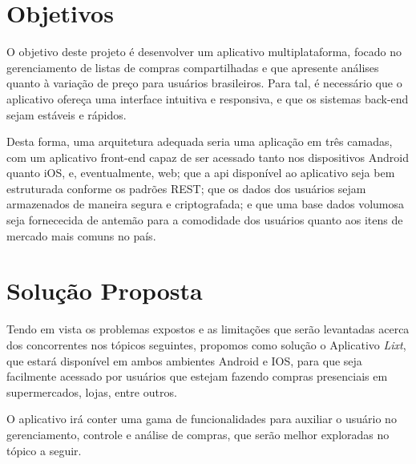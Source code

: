 \label{sec:objetivos}
\section{Objetivos}

O objetivo deste projeto é desenvolver um aplicativo multiplataforma,
focado no gerenciamento de listas de compras compartilhadas e que
apresente análises quanto à variação de preço para usuários
brasileiros. Para tal, é necessário que o aplicativo ofereça uma
interface intuitiva e responsiva, e que os sistemas back-end sejam
estáveis e rápidos.

Desta forma, uma arquitetura adequada seria uma aplicação em três
camadas, com um aplicativo front-end capaz de ser acessado tanto nos
dispositivos Android quanto iOS, e, eventualmente, web; que a api
disponível ao aplicativo seja bem estruturada conforme os padrões
REST; que os dados dos usuários sejam armazenados de maneira segura e
criptografada; e que uma base dados volumosa seja fornececida de antemão para a
comodidade dos usuários quanto aos itens de mercado mais comuns no país.

\label{sec:solucao}
\section{Solução Proposta}

Tendo em vista os problemas expostos e as limitações que serão levantadas acerca dos concorrentes nos tópicos seguintes, propomos como solução o Aplicativo \emph{Lixt}, que estará disponível em ambos ambientes Android e IOS, para que seja facilmente acessado por usuários que estejam fazendo compras presenciais em supermercados, lojas, entre outros.

O aplicativo irá conter uma gama de funcionalidades para auxiliar o usuário no gerenciamento, controle e análise de compras, que serão melhor exploradas no tópico a seguir.


